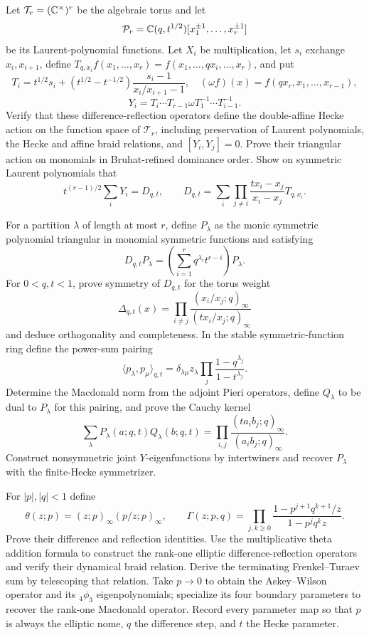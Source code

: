 \begin{exercise}
Let $\mathcal T_r=(\mathbb C^\times)^r$ be the algebraic torus and let
\[
 \mathcal P_r=\mathbb C(q,t^{1/2})[x_1^{\pm1},\ldots,x_r^{\pm1}]
\]
be its Laurent-polynomial functions.
Let $X_i$ be multiplication, let $s_i$ exchange $x_i,x_{i+1}$, define
$T_{q,x_i}f(x_1,\ldots,x_r)=f(x_1,\ldots,qx_i,\ldots,x_r)$, and put
\[
 T_i=t^{1/2}s_i+(t^{1/2}-t^{-1/2})
 \frac{s_i-1}{x_i/x_{i+1}-1},
 \quad
 (\omega f)(x)=f(qx_r,x_1,\ldots,x_{r-1}),
\]
\[
 Y_i=T_i\cdots T_{r-1}\omega T_1^{-1}\cdots T_{i-1}^{-1}.
\]
Verify that these difference-reflection operators define the double-affine
Hecke action on the function space of $\mathcal T_r$, including preservation
of Laurent polynomials, the Hecke and affine braid
relations, and $[Y_i,Y_j]=0$.  Prove their triangular action on monomials in
Bruhat-refined dominance order.  Show on symmetric Laurent polynomials that
\[
 t^{(r-1)/2}\sum_iY_i=D_{q,t},\qquad
 D_{q,t}=\sum_i\prod_{j\ne i}\frac{tx_i-x_j}{x_i-x_j}T_{q,x_i}.
\]
\end{exercise}

\begin{exercise}
For a partition $\lambda$ of length at most $r$, define $P_\lambda$ as the
monic symmetric polynomial triangular in monomial symmetric functions and
satisfying
\[
 D_{q,t}P_\lambda=\left(\sum_{i=1}^rq^{\lambda_i}t^{r-i}\right)P_\lambda.
\]
For $0<q,t<1$, prove symmetry of $D_{q,t}$ for the torus weight
\[
 \Delta_{q,t}(x)=\prod_{i\ne j}
 \frac{(x_i/x_j;q)_\infty}{(tx_i/x_j;q)_\infty}
\]
and deduce orthogonality and completeness.  In the stable symmetric-function
ring define the power-sum pairing
\[
 \langle p_\lambda,p_\mu\rangle_{q,t}
 =\delta_{\lambda\mu}z_\lambda
 \prod_j\frac{1-q^{\lambda_j}}{1-t^{\lambda_j}}.
\]
Determine the Macdonald norm from the adjoint Pieri operators, define
$Q_\lambda$ to be dual to $P_\lambda$ for this pairing, and prove the Cauchy
kernel
\[
 \sum_\lambda P_\lambda(a;q,t)Q_\lambda(b;q,t)
 =\prod_{i,j}\frac{(ta_ib_j;q)_\infty}{(a_ib_j;q)_\infty}.
\]
Construct nonsymmetric joint $Y$-eigenfunctions by intertwiners and recover
$P_\lambda$ with the finite-Hecke symmetrizer.
\end{exercise}

\begin{exercise}
For $|p|,|q|<1$ define
\[
 \theta(z;p)=(z;p)_\infty(p/z;p)_\infty,\qquad
 \Gamma(z;p,q)=\prod_{j,k\ge0}
 \frac{1-p^{j+1}q^{k+1}/z}{1-p^jq^kz}.
\]
Prove their difference and reflection identities.  Use the multiplicative
theta addition formula to construct the rank-one elliptic
difference-reflection operators and verify their dynamical braid relation.
Derive the terminating Frenkel--Turaev sum by telescoping that relation.
Take $p\to0$ to obtain the Askey--Wilson operator and its
${}_4\phi_3$ eigenpolynomials; specialize its four boundary parameters to
recover the rank-one Macdonald operator.  Record every parameter map so that
$p$ is always the elliptic nome, $q$ the difference step, and $t$ the Hecke
parameter.
\end{exercise}

